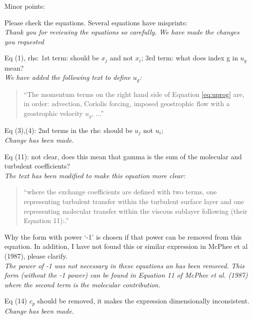 \documentclass[tc, manuscript]{copernicus}
\begin{document}
Minor points:\vspace{12pt}

Please check the equations. Several equations have misprints:\\
\textit{Thank you for reviewing the equations so carefully. We have made the changes you requested}\vspace{12pt}

Eq (1), rhs: 1st term: should be $x_j$ and not $x_i$; 3rd term: what does index g in $u_g$ mean?\\
\textit{We have added the following text to define $u_g$:}
\begin{quote}
``The momentum terms on the right hand side of Equation \ref{eq:uprog} are, in order: advection, Coriolis forcing, imposed geostrophic flow with a geostrophic velocity $u_g$, ...''
\end{quote}\vspace{12pt}

Eq (3),(4): 2nd terms in the rhs: should be $u_j$ not $u_i$;\\
\textit{Change has been made.}\vspace{12pt}

Eq (11): not clear, does this mean that gamma is the sum of the molecular and turbulent coefficients? \\
\textit{The text has been modified to make this equation more clear:}
\begin{quote}
``where the exchange coefficients are defined with two terms, one representing turbulent transfer within the turbulent surface layer and one representing molecular transfer within the viscous sublayer following \citet{mcphee_dynamics_1987} (their Equation 11):.''
\end{quote}\vspace{12pt}

Why the form with power ‘-1’ is chosen if that power can be removed from this equation. In addition, I have not found this or similar expression in McPhee et al (1987), please clarify.\\
\textit{The power of -1 was not necessary in these equations an has been removed. This form (without the -1 power) can be found in Equation 11 of McPhee et al. (1987) where the second term is the molecular contribution.}\vspace{12pt}

Eq (14) $c_p$ should be removed, it makes the expression dimensionally inconsistent.\\
\textit{Change has been made.}\vspace{12pt}
\end{document}
